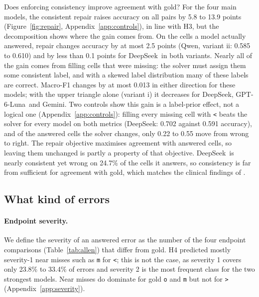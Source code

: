 \documentclass[11pt]{article}
\newcommand{\rel}[1]{\texttt{#1}}
\newcommand{\Ds}{DeepSeek}
\newcommand{\Gp}{GPT-6-Luna}
\newcommand{\Gm}{Gemini}
\newcommand{\Qw}{Qwen}
\begin{document}
Does enforcing consistency improve agreement with gold? For the four main models, the consistent repair raises accuracy on all pairs by 5.8 to 13.9 points (Figure~\ref{fig:repair}, Appendix~\ref{app:controls}), in line with H3, but the decomposition shows where the gain comes from. On the cells a model actually answered, repair changes accuracy by at most 2.5 points (\Qw, variant ii: 0.585 to 0.610) and by less than 0.1 points for \Ds\ in both variants. Nearly all of the gain comes from filling cells that were missing: the solver must assign them some consistent label, and with a skewed label distribution many of these labels are correct. Macro-F1 changes by at most 0.013 in either direction for these models; with the upper triangle alone (variant i) it decreases for \Ds, \Gp\ and \Gm. Two controls show this gain is a label-prior effect, not a logical one (Appendix~\ref{app:controls}): filling every missing cell with \rel{<} beats the solver for every model on both metrics (\Ds: 0.702 against 0.591 accuracy), and of the answered cells the solver changes, only 0.22 to 0.55 move from wrong to right. The repair objective maximises agreement with answered cells, so leaving them unchanged is partly a property of that objective. \Ds\ is nearly consistent yet wrong on 24.7\% of the cells it answers, so consistency is far from sufficient for agreement with gold, which matches the clinical findings of \citet{kougia-etal-2024-analysing}.

\subsection{What kind of errors}
\label{sec:errors}

\paragraph{Endpoint severity.}
We define the severity of an answered error as the number of the four endpoint comparisons (Table~\ref{tab:allen}) that differ from gold. H4 predicted mostly severity-1 near misses such as \rel{m} for \rel{<}; this is not the case, as severity 1 covers only 23.8\% to 33.4\% of errors and severity 2 is the most frequent class for the two strongest models. Near misses do dominate for gold \rel{o} and \rel{m} but not for \rel{>} (Appendix~\ref{app:severity}).
\end{document}
